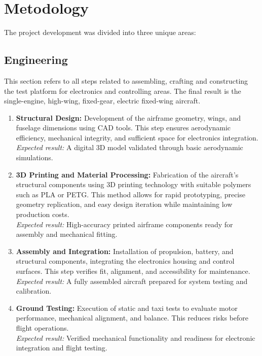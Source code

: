 \chapter{Metodology}

The project development was divided into three unique areas:

\section{Engineering}

This section refers to all steps related to assembling, crafting and constructing the test platform for electronics and controlling areas. The final result is the single-engine, high-wing, fixed-gear, electric fixed-wing aircraft.

\begin{enumerate}
    \item \textbf{Structural Design:} Development of the airframe geometry, wings, and fuselage dimensions using CAD tools. This step ensures aerodynamic efficiency, mechanical integrity, and sufficient space for electronics integration. \\
    \textit{Expected result:} A digital 3D model validated through basic aerodynamic simulations.
    
    \item \textbf{3D Printing and Material Processing:} Fabrication of the aircraft’s structural components using 3D printing technology with suitable polymers such as PLA or PETG. This method allows for rapid prototyping, precise geometry replication, and easy design iteration while maintaining low production costs. \\
    \textit{Expected result:} High-accuracy printed airframe components ready for assembly and mechanical fitting.

    \item \textbf{Assembly and Integration:} Installation of propulsion, battery, and structural components, integrating the electronics housing and control surfaces. This step verifies fit, alignment, and accessibility for maintenance. \\
    \textit{Expected result:} A fully assembled aircraft prepared for system testing and calibration.

    \item \textbf{Ground Testing:} Execution of static and taxi tests to evaluate motor performance, mechanical alignment, and balance. This reduces risks before flight operations. \\
    \textit{Expected result:} Verified mechanical functionality and readiness for electronic integration and flight testing.
\end{enumerate}


